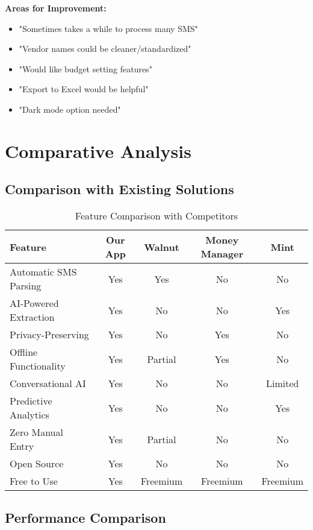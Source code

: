 \documentclass[11pt,a4paper]{report}
\begin{document}
\begin{itemize}
\begin{itemize}
\textbf{Areas for Improvement:}
\begin{itemize}
    \item "Sometimes takes a while to process many SMS"
    \item "Vendor names could be cleaner/standardized"
    \item "Would like budget setting features"
    \item "Export to Excel would be helpful"
    \item "Dark mode option needed"
\end{itemize}

\section{Comparative Analysis}

\subsection{Comparison with Existing Solutions}

\begin{table}[H]
\centering
\caption{Feature Comparison with Competitors}
\begin{tabularx}{\textwidth}{|X|c|c|c|c|}
\hline
\textbf{Feature} & \textbf{Our App} & \textbf{Walnut} & \textbf{Money Manager} & \textbf{Mint} \\
\hline
Automatic SMS Parsing & Yes & Yes & No & No \\
AI-Powered Extraction & Yes & No & No & Yes \\
Privacy-Preserving & Yes & No & Yes & No \\
Offline Functionality & Yes & Partial & Yes & No \\
Conversational AI & Yes & No & No & Limited \\
Predictive Analytics & Yes & No & No & Yes \\
Zero Manual Entry & Yes & Partial & No & No \\
Open Source & Yes & No & No & No \\
Free to Use & Yes & Freemium & Freemium & Freemium \\
\hline
\end{tabularx}
\end{table}

\subsection{Performance Comparison}


\end{itemize}
\end{itemize}
\end{document}
